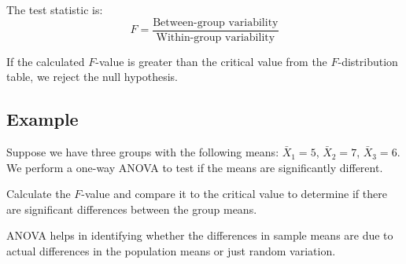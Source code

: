 \documentclass{article}
\begin{document}
The test statistic is:
\[
F = \frac{\text{Between-group variability}}{\text{Within-group variability}}
\]

If the calculated \(F\)-value is greater than the critical value from the \(F\)-distribution table, we reject the null hypothesis.

\subsection{Example}
Suppose we have three groups with the following means: \( \bar{X}_1 = 5 \), \( \bar{X}_2 = 7 \), \( \bar{X}_3 = 6 \). We perform a one-way ANOVA to test if the means are significantly different.

Calculate the \(F\)-value and compare it to the critical value to determine if there are significant differences between the group means.

ANOVA helps in identifying whether the differences in sample means are due to actual differences in the population means or just random variation.
\end{document}
